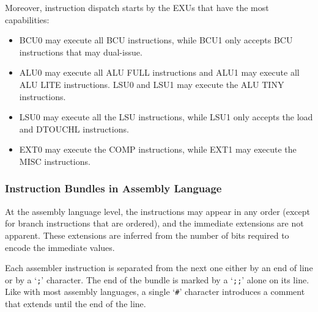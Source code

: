 Moreover, instruction dispatch starts by the EXUs that have the most capabilities: \begin{itemize}
\item BCU0 may execute all BCU instructions, while BCU1 only accepts BCU instructions that may dual-issue.
\item ALU0 may execute all ALU FULL instructions and ALU1 may execute all ALU LITE instructions. LSU0 and LSU1 may execute the ALU TINY instructions.
\item LSU0 may execute all the LSU instructions, while LSU1 only accepts the load and DTOUCHL instructions.
\item EXT0 may execute the COMP instructions, while EXT1 may execute the MISC instructions.
\end{itemize}

\smallskip

\subsubsection{Instruction Bundles in Assembly Language}

At the assembly language level, the instructions may appear in any order (except for branch instructions that are ordered), and the immediate extensions are not apparent. These extensions are inferred from the number of bits required to encode the immediate values.

Each assembler instruction is separated from the next one either by an end of
line or by a `\texttt{;}' character. The end of the bundle is marked by a
`\texttt{;;}' alone on its line. Like with most assembly languages, a single
`\texttt{\#}' character introduces a comment that extends until the end of the
line.

